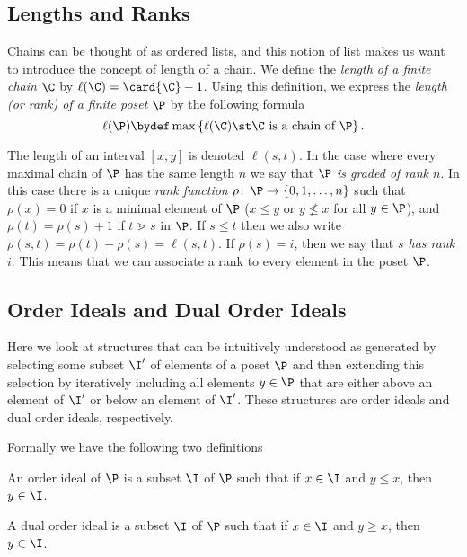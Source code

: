 \subsection{Lengths and Ranks}

Chains can be thought of as ordered lists, and this notion of list makes
us want to introduce the concept of length of a chain. We define the \emph{length
of a finite chain} \(\C\) by $\ell(\C) = \card{\C} - 1$. Using this definition, we
express the \emph{length (or rank) of a finite poset} $\P$ by the following formula
\begin{displaymath}
\ell(\P) \bydef \max\left\{{\ell(\C) \st \C ~\text{is a chain of}~ \P}\right\}.
\end{displaymath}

The length of an interval $[x, y]$ is denoted $\ell(s, t)$. In the case where
every maximal chain of $\P$ has the same length $n$ we say that \emph{$\P$ is graded of
rank $n$}. In this case there is a unique \emph{rank function} $\rho \colon\, \P \to \left\{{0,
1, \ldots , n}\right\}$ such that $\rho(x) = 0$ if $x$ is a minimal element of
$\P$ ($x \le y$ or $y \nleq x$ for all $y \in \P$), and $\rho(t) = \rho(s) + 1$
if $t \gtrdot s$ in $\P$. If $s \le t$ then we also write $\rho(s, t) = \rho(t)
- \rho(s) = \ell(s, t)$. If $\rho(s) = i$, then we say that \emph{$s$ has rank $i$}.
This means that we can associate a rank to every element in the poset $\P$.


\subsection{Order Ideals and Dual Order Ideals}

Here we look at structures that can be intuitively understood as generated by
selecting some subset $\I'$ of elements of a poset $\P$ and then extending this
selection by iteratively including all elements $y \in \P$ that
are either above an element of $\I'$ or below an element of $\I'$. These
structures are order ideals and dual order ideals, respectively.

Formally we have the following two definitions
\begin{definition}
An order ideal of $\P$ is a subset $\I$ of $\P$ such that if $x \in
\I$ and $y \le x$, then $y \in \I$.
\end{definition}
\begin{definition}
A dual order ideal is a subset $\I$ of $\P$ such that if $x \in \I$
and $y \ge x$, then $y \in \I$.
\end{definition}

